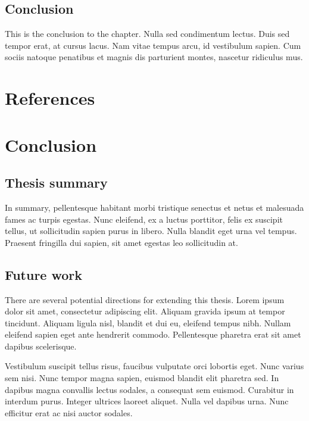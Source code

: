 \documentclass[12pt,a4paper,]{report}
\begin{document}
\section{Conclusion}\label{conclusion-6}

This is the conclusion to the chapter. Nulla sed condimentum lectus.
Duis sed tempor erat, at cursus lacus. Nam vitae tempus arcu, id
vestibulum sapien. Cum sociis natoque penatibus et magnis dis parturient
montes, nascetur ridiculus mus.

\footnotesize

\chapter{References}\label{references}

\chapter{Conclusion}\label{conclusion-7}

\section{Thesis summary}\label{thesis-summary}

In summary, pellentesque habitant morbi tristique senectus et netus et
malesuada fames ac turpis egestas. Nunc eleifend, ex a luctus porttitor,
felis ex suscipit tellus, ut sollicitudin sapien purus in libero. Nulla
blandit eget urna vel tempus. Praesent fringilla dui sapien, sit amet
egestas leo sollicitudin at.

\section{Future work}\label{future-work}

There are several potential directions for extending this thesis. Lorem
ipsum dolor sit amet, consectetur adipiscing elit. Aliquam gravida ipsum
at tempor tincidunt. Aliquam ligula nisl, blandit et dui eu, eleifend
tempus nibh. Nullam eleifend sapien eget ante hendrerit commodo.
Pellentesque pharetra erat sit amet dapibus scelerisque.

Vestibulum suscipit tellus risus, faucibus vulputate orci lobortis eget.
Nunc varius sem nisi. Nunc tempor magna sapien, euismod blandit elit
pharetra sed. In dapibus magna convallis lectus sodales, a consequat sem
euismod. Curabitur in interdum purus. Integer ultrices laoreet aliquet.
Nulla vel dapibus urna. Nunc efficitur erat ac nisi auctor sodales.
\end{document}

